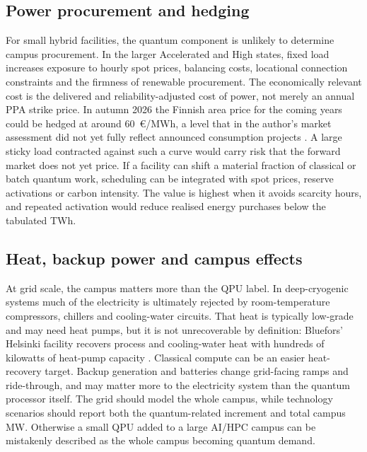 \documentclass[11pt,a4paper]{article}
\begin{document}
\subsection{Power procurement and hedging}
For small hybrid facilities, the quantum component is unlikely to determine campus procurement. In the larger Accelerated and High states, fixed load increases exposure to hourly spot prices, balancing costs, locational connection constraints and the firmness of renewable procurement. The economically relevant cost is the delivered and reliability-adjusted cost of power, not merely an annual PPA strike price. In autumn 2026 the Finnish area price for the coming years could be hedged at around 60~\euro/MWh, a level that in the author's market assessment did not yet fully reflect announced consumption projects \citep{merilehto2026blog}. A large sticky load contracted against such a curve would carry risk that the forward market does not yet price. If a facility can shift a material fraction of classical or batch quantum work, scheduling can be integrated with spot prices, reserve activations or carbon intensity. The value is highest when it avoids scarcity hours, and repeated activation would reduce realised energy purchases below the tabulated TWh.

\subsection{Heat, backup power and campus effects}
At grid scale, the campus matters more than the QPU label. In deep-cryogenic systems much of the electricity is ultimately rejected by room-temperature compressors, chillers and cooling-water circuits. That heat is typically low-grade and may need heat pumps, but it is not unrecoverable by definition: Bluefors' Helsinki facility recovers process and cooling-water heat with hundreds of kilowatts of heat-pump capacity \citep{bluefors2024heat}. Classical compute can be an easier heat-recovery target. Backup generation and batteries change grid-facing ramps and ride-through, and may matter more to the electricity system than the quantum processor itself. The grid should model the whole campus, while technology scenarios should report both the quantum-related increment and total campus MW. Otherwise a small QPU added to a large AI/HPC campus can be mistakenly described as the whole campus becoming quantum demand.

\end{document}
